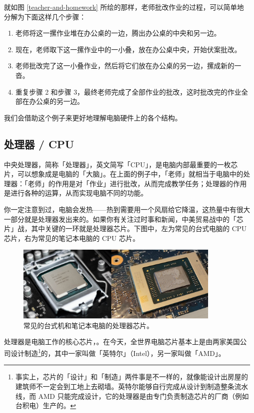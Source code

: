 就如图 \ref{teacher-and-homework} 所绘的那样，老师批改作业的过程，可以简单地分解为下面这样几个步骤：

\begin{enumerate}
  \item 老师将这一摞作业堆在办公桌的一边，腾出办公桌的中央和另一边。
  \item 现在，老师取下这一摞作业中的一小叠，放在办公桌中央，开始伏案批改。
  \item 老师批改完了这一小叠作业，然后将它们放在办公桌的另一边，摞成新的一沓。
  \item 重复步骤 2 和步骤 3，最终老师完成了全部作业的批改，这时批改完的作业全部在办公桌的另一边。
\end{enumerate}

我们会借助这个例子来更好地理解电脑硬件上的各个结构。

\subsection{处理器 / CPU}

中央处理器，简称「处理器」，英文简写「CPU」，是电脑内部最重要的一枚芯片，可以想象成是电脑的「大脑」。在上面的例子中，「老师」就相当于电脑中的处理器：「老师」的作用是对「作业」进行批改，从而完成教学任务；处理器的作用是进行各种的运算，从而实现电脑不同的功能。

你一定注意到过，电脑会发热——热到需要用一个风扇给它降温，这热量中有很大一部分就是处理器发出来的。如果你有关注过时事和新闻，中美贸易战中的「芯片」战，其中关键的一环就是处理器芯片。下图中，左为常见的台式电脑的 CPU 芯片，右为常见的笔记本电脑的 CPU 芯片。

\begin{figure}[H]
  \centering
  \includegraphics[width=10cm]{assets/CPUs.jpg}
  \caption{常见的台式机和笔记本电脑的处理器芯片。}
  \label{cpus}
\end{figure}

处理器是电脑工作的核心芯片，。在今天，全世界电脑芯片基本上是由两家美国公司设计制造\footnote{事实上，芯片的「设计」和「制造」两件事是不一样的，就像能设计出房屋的建筑师不一定会到工地上去砌墙。英特尔能够自行完成从设计到制造整条流水线，而 AMD 只能完成设计，它的处理器是由专门负责制造芯片的厂商（例如台积电）生产的。}的，其中一家叫做「英特尔」（Intel），另一家叫做「AMD」。

